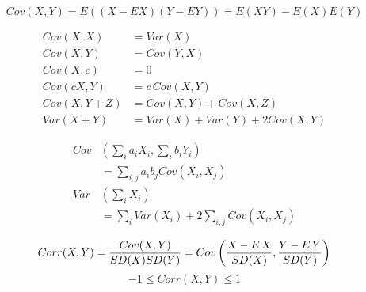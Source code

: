 \begin{slide}[Covariance]
$$Cov(X,Y) = E((X-EX)(Y-EY) ) = E(XY) - E(X)E(Y)$$
\begin{minipage}{0.5\textwidth}
\begin{align*}
  Cov(X,X) &= Var(X)\\
  Cov(X,Y) &=Cov(Y,X)\\
  Cov(X,c) &=0\\
  Cov(cX,Y)&=c\,Cov(X,Y)\\
  Cov(X,Y+Z)&=Cov(X,Y)+Cov(X,Z)\\
  Var(X +Y) &= Var(X)+Var(Y)+2Cov(X,Y)
\end{align*}
\end{minipage}
\begin{minipage}{0.5\textwidth}
\begin{align*}\textstyle 
Cov&\left(\textstyle \sum_{i}a_iX_i,\sum_{i}b_iY_i\right)\\&=\textstyle \sum_{i,j}a_ib_jCov(X_i,X_j)
\\
Var&\left(\textstyle \sum_{i}X_i\right)\\&=\textstyle \sum_{i}Var(X_i)+2\sum_{i,j}Cov(X_i,X_j)
\end{align*}
\end{minipage}
\vspace{20pt}
$$Corr(X,Y) = {Cov(X,Y) \over SD(X)SD(Y)} = Cov\left({X-E\,X \over SD(X) },{Y-E\,Y \over SD(Y) } \right)$$
$$-1\leq Corr(X,Y)\leq 1$$
\end{slide}